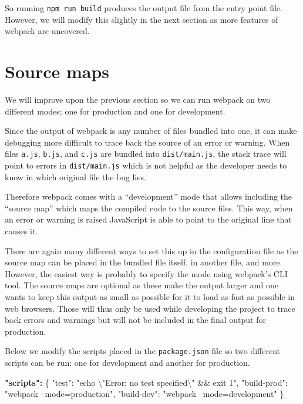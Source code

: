 \documentclass[10pt,]{krantz}
\makeatletter
\newenvironment{Shaded}{\begin{snugshade}}{\end{snugshade}}
\newcommand{\CharTok}[1]{\textcolor[rgb]{0.5,0.5,0.5}{#1}}
\newcommand{\DataTypeTok}[1]{\textcolor[rgb]{0.27,0.27,0.27}{#1}}
\newcommand{\ErrorTok}[1]{\textcolor[rgb]{0.14,0.14,0.14}{\textbf{#1}}}
\newcommand{\FunctionTok}[1]{\textcolor[rgb]{0,0,0}{#1}}
\newcommand{\StringTok}[1]{\textcolor[rgb]{0.5,0.5,0.5}{#1}}
\newenvironment{kframe}{%
\medskip{}
\setlength{\fboxsep}{.8em}
 \def\at@end@of@kframe{}%
 \ifinner\ifhmode%
  \def\at@end@of@kframe{\end{minipage}}%
  \begin{minipage}{\columnwidth}%
 \fi\fi%
 \def\FrameCommand##1{\hskip\@totalleftmargin \hskip-\fboxsep
 \colorbox{shadecolor}{##1}\hskip-\fboxsep
     \hskip-\linewidth \hskip-\@totalleftmargin \hskip\columnwidth}%
 \MakeFramed {\advance\hsize-\width
   \@totalleftmargin\z@ \linewidth\hsize
   \@setminipage}}%
 {\par\unskip\endMakeFramed%
 \at@end@of@kframe}
\renewenvironment{Shaded}{\begin{kframe}}{\end{kframe}}
\makeatother
\begin{document}
So running \texttt{npm\ run\ build} produces the output file from the entry point file. However, we will modify this slightly in the next section as more features of webpack are uncovered.

\hypertarget{webpack-intro-webpack-mode}{%
\section{Source maps}\label{webpack-intro-webpack-mode}}

We will improve upon the previous section so we can run webpack on two different modes; one for production and one for development.

Since the output of webpack is any number of files bundled into one, it can make debugging more difficult to trace back the source of an error or warning. When files \texttt{a.js}, \texttt{b.js}, and \texttt{c.js} are bundled into \texttt{dist/main.js}, the stack trace will point to errors in \texttt{dist/main.js} which is not helpful as the developer needs to know in which original file the bug lies.

Therefore webpack comes with a ``development'' mode that allows including the ``source map'' which maps the compiled code to the source files. This way, when an error or warning is raised JavaScript is able to point to the original line that causes it.

There are again many different ways to set this up in the configuration file as the source map can be placed in the bundled file itself, in another file, and more. However, the easiest way is probably to specify the mode using webpack's CLI tool. The source maps are optional as these make the output larger and one wants to keep this output as small as possible for it to load as fast as possible in web browsers. Those will thus only be used while developing the project to trace back errors and warnings but will not be included in the final output for production.

Below we modify the scripts placed in the \texttt{package.json} file so two different scripts can be run: one for development and another for production.

\begin{Shaded}
\begin{Highlighting}[]
\ErrorTok{"scripts":} \FunctionTok{\{}
  \DataTypeTok{"test"}\FunctionTok{:} \StringTok{"echo }\CharTok{\textbackslash{}"}\StringTok{Error: no test specified}\CharTok{\textbackslash{}"}\StringTok{ && exit 1"}\FunctionTok{,}
  \DataTypeTok{"build-prod"}\FunctionTok{:} \StringTok{"webpack --mode=production"}\FunctionTok{,}
  \DataTypeTok{"build-dev"}\FunctionTok{:} \StringTok{"webpack --mode=development"}
\FunctionTok{\}}
\end{Highlighting}
\end{Shaded}
\end{document}

